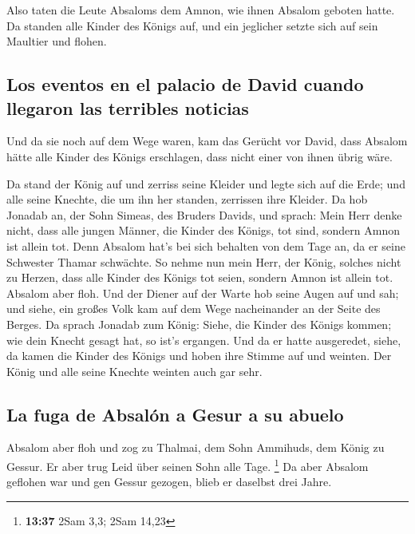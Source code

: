  Also taten die Leute Absaloms dem Amnon, wie ihnen
Absalom geboten hatte. Da standen alle Kinder des Königs auf, und ein
jeglicher setzte sich auf sein Maultier und flohen.

\hypertarget{los-eventos-en-el-palacio-de-david-cuando-llegaron-las-terribles-noticias}{%
\subsection{Los eventos en el palacio de David cuando llegaron las
terribles
noticias}\label{los-eventos-en-el-palacio-de-david-cuando-llegaron-las-terribles-noticias}}

 Und da sie noch auf dem Wege waren, kam das Gerücht vor
David, dass Absalom hätte alle Kinder des Königs erschlagen, dass nicht
einer von ihnen übrig wäre.

 Da stand der König auf und zerriss seine Kleider und
legte sich auf die Erde; und alle seine Knechte, die um ihn her standen,
zerrissen ihre Kleider.  Da hob Jonadab an, der Sohn
Simeas, des Bruders Davids, und sprach: Mein Herr denke nicht, dass alle
jungen Männer, die Kinder des Königs, tot sind, sondern Amnon ist allein
tot. Denn Absalom hat's bei sich behalten von dem Tage an, da er seine
Schwester Thamar schwächte.  So nehme nun mein Herr, der
König, solches nicht zu Herzen, dass alle Kinder des Königs tot seien,
sondern Amnon ist allein tot.  Absalom aber floh. Und der
Diener auf der Warte hob seine Augen auf und sah; und siehe, ein großes
Volk kam auf dem Wege nacheinander an der Seite des Berges.
 Da sprach Jonadab zum König: Siehe, die Kinder des
Königs kommen; wie dein Knecht gesagt hat, so ist's ergangen.
 Und da er hatte ausgeredet, siehe, da kamen die Kinder
des Königs und hoben ihre Stimme auf und weinten. Der König und alle
seine Knechte weinten auch gar sehr.

\hypertarget{la-fuga-de-absaluxf3n-a-gesur-a-su-abuelo}{%
\subsection{La fuga de Absalón a Gesur a su
abuelo}\label{la-fuga-de-absaluxf3n-a-gesur-a-su-abuelo}}

 Absalom aber floh und zog zu Thalmai, dem Sohn Ammihuds,
dem König zu Gessur. Er aber trug Leid über seinen Sohn alle Tage.
\footnote{\textbf{13:37} 2Sam 3,3; 2Sam 14,23}  Da aber
Absalom geflohen war und gen Gessur gezogen, blieb er daselbst drei
Jahre.

